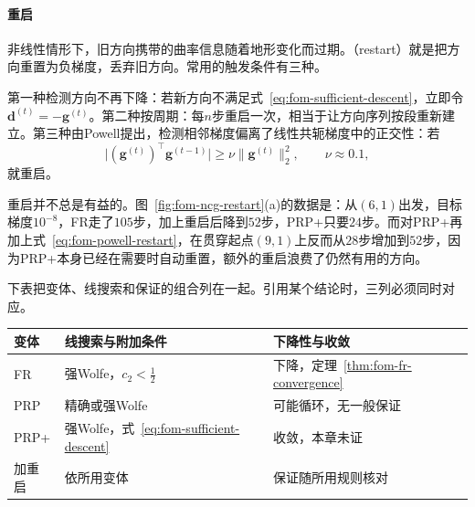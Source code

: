 \paragraph{重启}
非线性情形下，旧方向携带的曲率信息随着地形变化而过期。（restart）就是把方向重置为负梯度，丢弃旧方向。常用的触发条件有三种。

第一种检测方向不再下降：若新方向不满足式~\eqref{eq:fom-sufficient-descent}，立即令$\bm{d}^{(t)}=-\bm{g}^{(t)}$。第二种按周期：每$n$步重启一次，相当于让方向序列按段重新建立。第三种由Powell提出，检测相邻梯度偏离了线性共轭梯度中的正交性：若
\begin{equation}
 \bigl\lvert(\bm{g}^{(t)})^\top\bm{g}^{(t-1)}\bigr\rvert\geq\nu\lVert\bm{g}^{(t)}\rVert_2^2,\qquad\nu\approx0.1,
 \label{eq:fom-powell-restart}
\end{equation}
就重启。

重启并不总是有益的。图~\ref{fig:fom-ncg-restart}(a)的数据是：从$(6,1)$出发，目标梯度$10^{-8}$，FR走了$105$步，加上重启后降到$52$步，PRP+只要$24$步。而对PRP+再加上式~\eqref{eq:fom-powell-restart}，在贯穿起点$(9,1)$上反而从$28$步增加到$52$步，因为PRP+本身已经在需要时自动重置，额外的重启浪费了仍然有用的方向。

下表把变体、线搜索和保证的组合列在一起。引用某个结论时，三列必须同时对应。

\begin{BookInlineTable}
  \centering
  \caption{非线性共轭梯度的常见组合，表中收敛都是$\liminf\lVert\bm{g}^{(t)}\rVert_2=0$。}
  \label{tab:fom-ncg-combos}
  \begin{tabular}{lll}
   \toprule
   变体 & 线搜索与附加条件 & 下降性与收敛\\
   \midrule
   FR & 强Wolfe，$c_2<\tfrac12$ & 下降，定理~\ref{thm:fom-fr-convergence}\\
   PRP & 精确或强Wolfe & 可能循环，无一般保证\\
   PRP+ & 强Wolfe，式~\eqref{eq:fom-sufficient-descent} & 收敛，本章未证\\
   加重启 & 依所用变体 & 保证随所用规则核对\\
   \bottomrule
  \end{tabular}
\end{BookInlineTable}
